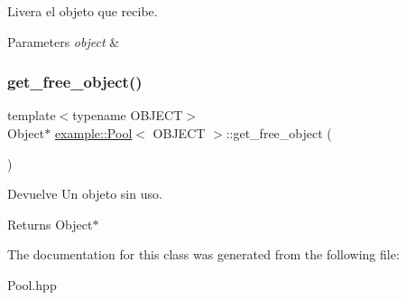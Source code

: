 Livera el objeto que recibe. 


\begin{DoxyParams}{Parameters}
{\em object} & \\
\hline
\end{DoxyParams}
\mbox{\label{classexample_1_1_pool_a0456b908b50255679dfa5d58939e97c6}} 
\subsubsection{\texorpdfstring{get\_free\_object()}{get\_free\_object()}}
{\footnotesize\ttfamily template$<$typename O\+B\+J\+E\+CT$>$ \\
Object$\ast$ \mbox{\hyperlink{classexample_1_1_pool}{example\+::\+Pool}}$<$ O\+B\+J\+E\+CT $>$\+::get\+\_\+free\+\_\+object (\begin{DoxyParamCaption}{ }\end{DoxyParamCaption})\hspace{0.3cm}{\ttfamily [inline]}}



Devuelve Un objeto sin uso. 

\begin{DoxyReturn}{Returns}
Object$\ast$ 
\end{DoxyReturn}


The documentation for this class was generated from the following file\+:\begin{DoxyCompactItemize}
\item 
Pool.\+hpp\end{DoxyCompactItemize}
